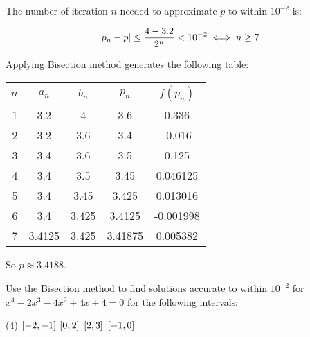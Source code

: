 \documentclass[../../../../Assignments.tex]{subfiles}
\begin{document}
\begin{solution}
\begin{enumerate}[label = (\alph*)]
            The number of iteration \(n\) needed to approximate \(p\) to within
            \(10^{-2}\) is:

            \[\abs{p_n - p} \leq \frac{4 - \num{3.2}}{2^n} < 10^{-2} \iff n \geq 7\]

            Applying Bisection method generates the following table:

            \begin{table}[H]
                \centering
                \begin{tabular}{r S[table-format=1.5] S[table-format=1.6] S[table-format=1.6] S[table-format=-1.6]}
                    \toprule
                    \(n\)  &  {\(a_n\)}  &  {\(b_n\)}  &  {\(p_n\)}  &  {\(f(p_n)\)}  \\
                      &  3.2        &  4          &  3.6        &   0.336        \\
                        2  &  3.2        &  3.6        &  3.4        &  -0.016        \\
                        3  &  3.4        &  3.6        &  3.5        &   0.125        \\
                        4  &  3.4        &  3.5        &  3.45       &   0.046125     \\
                        5  &  3.4        &  3.45       &  3.425      &   0.013016     \\
                        6  &  3.4        &  3.425      &  3.4125     &  -0.001998     \\
                        7  &  3.4125     &  3.425      &  3.41875    &   0.005382     \\
                    \bottomrule
                \end{tabular}
            \end{table}

            So \(p \approx \num{3.4188}\).
    \end{enumerate}
\end{solution}

\begin{exercise}
    Use the Bisection method to find solutions accurate to within \(10^{-2}\)
    for \(x^4 - 2x^3 - 4x^2 + 4x + 4 = 0\) for the following intervals:

    \begin{tasks}(4)
        \task \(\interval{-2}{-1}\)
        \task \(\interval{0}{2}\)
        \task \(\interval{2}{3}\)
        \task \(\interval{-1}{0}\)
    \end{tasks}
\end{exercise}
\end{document}
